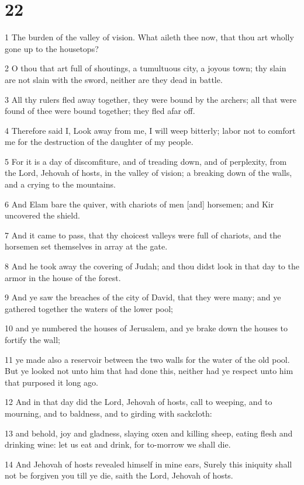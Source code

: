 \chapter{22}

\par 1 The burden of the valley of vision. What aileth thee now, that thou art wholly gone up to the housetops?
\par 2 O thou that art full of shoutings, a tumultuous city, a joyous town; thy slain are not slain with the sword, neither are they dead in battle.
\par 3 All thy rulers fled away together, they were bound by the archers; all that were found of thee were bound together; they fled afar off.
\par 4 Therefore said I, Look away from me, I will weep bitterly; labor not to comfort me for the destruction of the daughter of my people.
\par 5 For it is a day of discomfiture, and of treading down, and of perplexity, from the Lord, Jehovah of hosts, in the valley of vision; a breaking down of the walls, and a crying to the mountains.
\par 6 And Elam bare the quiver, with chariots of men [and] horsemen; and Kir uncovered the shield.
\par 7 And it came to pass, that thy choicest valleys were full of chariots, and the horsemen set themselves in array at the gate.
\par 8 And he took away the covering of Judah; and thou didst look in that day to the armor in the house of the forest.
\par 9 And ye saw the breaches of the city of David, that they were many; and ye gathered together the waters of the lower pool;
\par 10 and ye numbered the houses of Jerusalem, and ye brake down the houses to fortify the wall;
\par 11 ye made also a reservoir between the two walls for the water of the old pool. But ye looked not unto him that had done this, neither had ye respect unto him that purposed it long ago.
\par 12 And in that day did the Lord, Jehovah of hosts, call to weeping, and to mourning, and to baldness, and to girding with sackcloth:
\par 13 and behold, joy and gladness, slaying oxen and killing sheep, eating flesh and drinking wine: let us eat and drink, for to-morrow we shall die.
\par 14 And Jehovah of hosts revealed himself in mine ears, Surely this iniquity shall not be forgiven you till ye die, saith the Lord, Jehovah of hosts.
